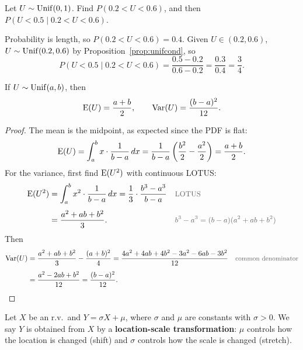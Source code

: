 \begin{example}
  Let $U \sim \operatorname{Unif}(0, 1)$. Find $P(0.2 < U < 0.6)$, and then $P(U < 0.5 \mid 0.2 < U < 0.6)$.
\end{example}

\begin{solution}
  Probability is length, so $P(0.2 < U < 0.6) = 0.4$. Given $U \in (0.2, 0.6)$, $U \sim \operatorname{Unif}(0.2, 0.6)$ by Proposition~\ref{prop:unifcond}, so
  \[
    P(U < 0.5 \mid 0.2 < U < 0.6) = \frac{0.5 - 0.2}{0.6 - 0.2} = \frac{0.3}{0.4} = \frac{3}{4}.
  \]
\end{solution}

\begin{theorem}\label{thm:unifEV}
  If $U \sim \operatorname{Unif}(a, b)$, then
  \[
    \operatorname{E}(U) = \frac{a + b}{2},
    \qquad
    \operatorname{Var}(U) = \frac{(b - a)^{2}}{12}.
  \]
\end{theorem}

\begin{proof}
  The mean is the midpoint, as expected since the PDF is flat:
  \[
    \operatorname{E}(U) = \int_{a}^{b} x \cdot \frac{1}{b - a}\,dx = \frac{1}{b - a}\left(\frac{b^{2}}{2} - \frac{a^{2}}{2}\right) = \frac{a + b}{2}.
  \]
  For the variance, first find $\operatorname{E}(U^{2})$ with continuous LOTUS:
  \begin{align*}
    \E(U^{2})
      &= \int_{a}^{b} x^{2} \cdot \frac{1}{b - a}\,dx
       = \frac{1}{3} \cdot \frac{b^{3} - a^{3}}{b - a}
      && \by{LOTUS} \\[0.4em]
      &= \frac{a^{2} + ab + b^{2}}{3}.
      && \by{$b^{3} - a^{3} = (b - a)(a^{2} + ab + b^{2})$}
  \end{align*}
  Then
  \begin{align*}
    \Var(U)
      &= \frac{a^{2} + ab + b^{2}}{3} - \frac{(a + b)^{2}}{4}
       = \frac{4a^{2} + 4ab + 4b^{2} - 3a^{2} - 6ab - 3b^{2}}{12}
      && \by{common denominator} \\[0.4em]
      &= \frac{a^{2} - 2ab + b^{2}}{12}
       = \frac{(b - a)^{2}}{12}.
  \end{align*}
\end{proof}

\begin{definition}\label{def:locscale}
  Let $X$ be an r.v.\ and $Y = \sigma X + \mu$, where $\sigma$ and $\mu$ are constants with $\sigma > 0$. We say $Y$ is obtained from $X$ by a \textbf{location-scale transformation}: $\mu$ controls how the location is changed (shift) and $\sigma$ controls how the scale is changed (stretch).
\end{definition}

